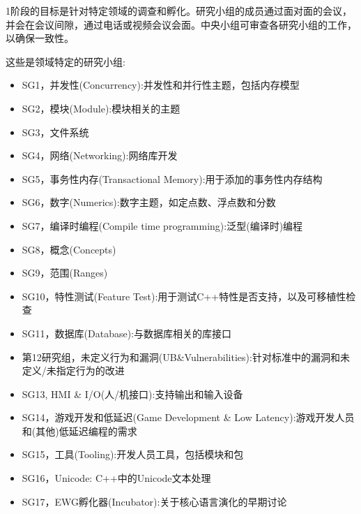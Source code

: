 

1阶段的目标是针对特定领域的调查和孵化。研究小组的成员通过面对面的会议，并会在会议间隙，通过电话或视频会议会面。中央小组可审查各研究小组的工作，以确保一致性。

这些是领域特定的研究小组:

\begin{itemize}
\item 
SG1，并发性(Concurrency):并发性和并行性主题，包括内存模型

\item 
SG2，模块(Module):模块相关的主题

\item 
SG3，文件系统

\item 
SG4，网络(Networking):网络库开发

\item 
SG5，事务性内存(Transactional Memory):用于添加的事务性内存结构

\item 
SG6，数字(Numerics):数字主题，如定点数、浮点数和分数

\item 
SG7，编译时编程(Compile time programming):泛型(编译时)编程

\item 
SG8，概念(Concepts)

\item 
SG9，范围(Ranges)

\item 
SG10，特性测试(Feature Test):用于测试C++特性是否支持，以及可移植性检查

\item 
SG11，数据库(Database):与数据库相关的库接口

\item 
第12研究组，未定义行为和漏洞(UB\&Vulnerabilities):针对标准中的漏洞和未定义/未指定行为的改进

\item 
SG13, HMI \& I/O(人/机接口):支持输出和输入设备

\item 
SG14，游戏开发和低延迟(Game Development \& Low Latency):游戏开发人员和(其他)低延迟编程的需求

\item 
SG15，工具(Tooling):开发人员工具，包括模块和包

\item 
SG16，Unicode: C++中的Unicode文本处理

\item 
SG17，EWG孵化器(Incubator):关于核心语言演化的早期讨论


\end{itemize}

